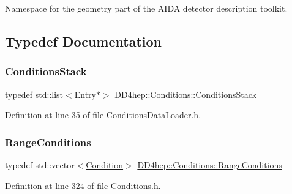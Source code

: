 Namespace for the geometry part of the A\+I\+DA detector description toolkit. 

\subsection{Typedef Documentation}
\hypertarget{namespace_d_d4hep_1_1_conditions_ac894ba79dbc97adf0ab8143bdd8bd2e3}{}\label{namespace_d_d4hep_1_1_conditions_ac894ba79dbc97adf0ab8143bdd8bd2e3} 
\subsubsection{\texorpdfstring{Conditions\+Stack}{ConditionsStack}}
{\footnotesize\ttfamily typedef std\+::list$<$\hyperlink{class_d_d4hep_1_1_conditions_1_1_entry}{Entry}$\ast$$>$ \hyperlink{namespace_d_d4hep_1_1_conditions_ac894ba79dbc97adf0ab8143bdd8bd2e3}{D\+D4hep\+::\+Conditions\+::\+Conditions\+Stack}}



Definition at line 35 of file Conditions\+Data\+Loader.\+h.

\hypertarget{namespace_d_d4hep_1_1_conditions_ae765f0140a33973a430280f02b6062f4}{}\label{namespace_d_d4hep_1_1_conditions_ae765f0140a33973a430280f02b6062f4} 
\subsubsection{\texorpdfstring{Range\+Conditions}{RangeConditions}}
{\footnotesize\ttfamily typedef std\+::vector$<$\hyperlink{class_d_d4hep_1_1_conditions_1_1_condition}{Condition}$>$ \hyperlink{namespace_d_d4hep_1_1_conditions_ae765f0140a33973a430280f02b6062f4}{D\+D4hep\+::\+Conditions\+::\+Range\+Conditions}}



Definition at line 324 of file Conditions.\+h.

\hypertarget{namespace_d_d4hep_1_1_conditions_a6fa51615b9757a9ffccb7377f0617ee4}{}\label{namespace_d_d4hep_1_1_conditions_a6fa51615b9757a9ffccb7377f0617ee4} 
